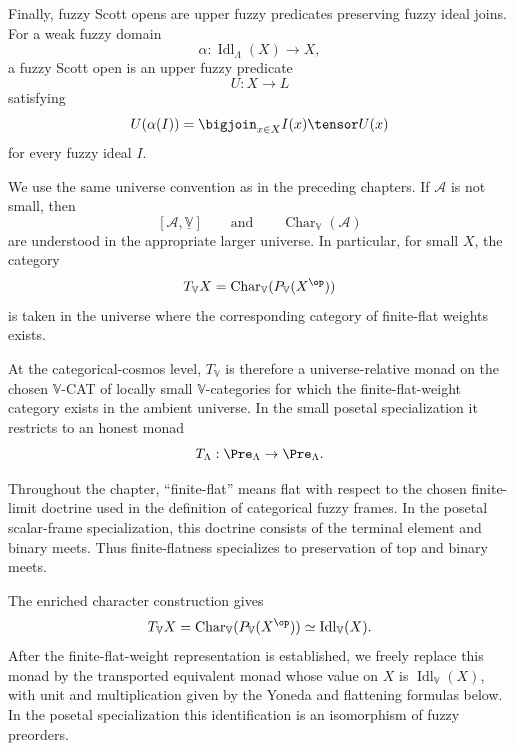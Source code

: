 Finally, fuzzy Scott opens are upper fuzzy predicates preserving fuzzy ideal joins.
For a weak fuzzy domain
\[
    \alpha:\operatorname{Idl}_\Lambda(X)\to X,
\]
a fuzzy Scott open is an upper fuzzy predicate
\[
    U:X\to L
\]
satisfying
\[
    U(\alpha(I))
    =
    \bigjoin_{x\in X} I(x)\tensor U(x)
\]
for every fuzzy ideal \(I\).

\begin{remark}
\label{rem:ideal-monad-universe-and-doctrine-convention}
We use the same universe convention as in the preceding chapters.  If
\(\mathcal A\) is not small, then
\[
    [\mathcal A,\underline{\mathbb V}]
    \qquad\text{and}\qquad
    \operatorname{Char}_{\mathbb V}(\mathcal A)
\]
are understood in the appropriate larger universe.  In particular, for small
\(X\), the category
\[
    T_{\mathbb V}X
    =
    \operatorname{Char}_{\mathbb V}(P_{\mathbb V}(X^{\op}))
\]
is taken in the universe where the corresponding category of finite-flat weights
exists.

At the categorical-cosmos level, \(T_{\mathbb V}\) is therefore a
universe-relative monad on the chosen \(\mathbb V\)-CAT of locally small
\(\mathbb V\)-categories for which the finite-flat-weight category exists in the
ambient universe.  In the small posetal specialization it restricts to an honest
monad
\[
    T_\Lambda:\Pre_\Lambda\to\Pre_\Lambda.
\]

Throughout the chapter, ``finite-flat'' means flat with respect to the chosen
finite-limit doctrine used in the definition of categorical fuzzy frames.  In the
posetal scalar-frame specialization, this doctrine consists of the terminal element
and binary meets.  Thus finite-flatness specializes to preservation of top and
binary meets.
\end{remark}

\begin{remark}
\label{rem:strictification-ideal-monad}
The enriched character construction gives
\[
    T_{\mathbb V}X
    =
    \operatorname{Char}_{\mathbb V}(P_{\mathbb V}(X^{\op}))
    \simeq
    \operatorname{Idl}_{\mathbb V}(X).
\]
After the finite-flat-weight representation is established, we freely replace this
monad by the transported equivalent monad whose value on \(X\) is
\(\operatorname{Idl}_{\mathbb V}(X)\), with unit and multiplication given by the
Yoneda and flattening formulas below.  In the posetal specialization this
identification is an isomorphism of fuzzy preorders.
\end{remark}

